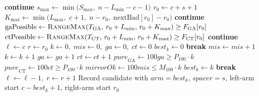 \documentclass{article}
\begin{document}
\begin{algorithm}
\begin{algorithmic}[1]
     
        \State \textbf{continue}
    \EndIf
    \State $s_{\max} \gets \min\bigl(S_{\max},\; n - L_{\min} - c - 1\bigr)$
        \State $r_0 \gets c + s + 1$ 
            \State $K_{\max} \gets \min\bigl(L_{\max},\; c+1,\; n-r_0,\;
                   \mathrm{nextBad}[r_0]-r_0\bigr)$
                \State \textbf{continue}
            \EndIf
            \State $\mathrm{gaPossible} \gets
                   \textsc{RangeMax}(T_{\mathrm{GA}},\, r_0+L_{\min},\, r_0+K_{\max})
                   \ge F_{\mathrm{GA}}[r_0]$
            \State $\mathrm{ctPossible} \gets
                   \textsc{RangeMax}(T_{\mathrm{CT}},\, r_0+L_{\min},\, r_0+K_{\max})
                   \ge F_{\mathrm{CT}}[r_0]$
                \State \textbf{continue} 
            \EndIf
        \EndIf
        \State $\ell \gets c$ 
        \State $r \gets r_0$ 
        \State $k \gets 0,\; \textit{mis} \gets 0,\; \textit{ga} \gets 0,\; \textit{ct} \gets 0$
        \State $\textit{best}_k \gets 0$
             \State \textbf{break} \EndIf
             \State $\textit{mis} \gets \textit{mis} + 1$ \EndIf
            \State $k \gets k + 1$
             $\textit{ga} \gets \textit{ga} + 1$ \Else $\textit{ct} \gets \textit{ct} + 1$ \EndIf
                \State $\textit{pure}_{\text{GA}} \gets 100\textit{ga} \ge P_{100} \cdot k$
                \State $\textit{pure}_{\text{CT}} \gets 100\textit{ct} \ge P_{100} \cdot k$
                \State $\textit{mirrorOk} \gets 100\textit{mis} \le M_{100} \cdot k$
                    \State $\textit{best}_k \gets k$ 
                \EndIf
                 \State \textbf{break} \EndIf
            \EndIf
            \State $\ell \gets \ell - 1,\; r \gets r + 1$
        \EndWhile
            \State Record candidate with $\textit{arm} = \textit{best}_k$, $\textit{spacer} = s$,
                   left-arm start $c - \textit{best}_k + 1$, right-arm start $r_0$
        \EndIf
    \EndFor
\EndFor


\end{algorithmic}
\end{algorithm}
\end{document}
